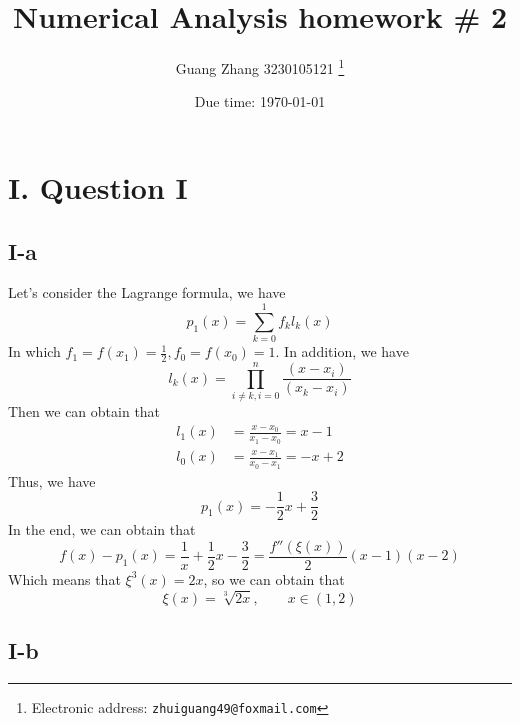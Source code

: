 \documentclass[a4paper]{article}
\begin{document}
\title{Numerical Analysis homework \# 2}

\author{Guang Zhang 3230105121
  \thanks{Electronic address: \texttt{zhuiguang49@foxmail.com}}}

\date{Due time: \today}

\maketitle



\section*{I. Question I}

\subsection*{I-a}
Let's consider the Lagrange formula, we have
\begin{equation}
  p_1(x)=\sum_{k=0}^1 f_kl_k(x) \label{eq:Lagrange formula}
\end{equation}
In which $f_1=f(x_1)=\frac{1}{2},f_0=f(x_0)=1$. In addition, we have 
\begin{equation}
  l_k(x)=\prod_{i\neq k,i=0}^n\frac{(x-x_i)}{(x_k-x_i)} \label{eq:base polynomial}
\end{equation}
Then we can obtain that 
\begin{align}
  l_1(x) &= \frac{x - x_0}{x_1 - x_0} = x - 1 \\
  l_0(x) &= \frac{x - x_1}{x_0 - x_1} = -x + 2
\end{align}
Thus, we have
\begin{equation}
  p_1(x)=-\frac{1}{2}x+\frac{3}{2}
\end{equation}
In the end, we can obtain that
\begin{equation}
  f(x)-p_1(x)=\frac{1}{x}+\frac{1}{2}x-\frac{3}{2}=\frac{f''(\xi(x))}{2}(x-1)(x-2)
\end{equation}
Which means that $\xi^3(x)=2x$, so we can obtain that
\begin{equation}
  \xi(x)=\sqrt[3]{2x},\qquad x\in(1,2)
\end{equation}

\subsection*{I-b}
\end{document}
